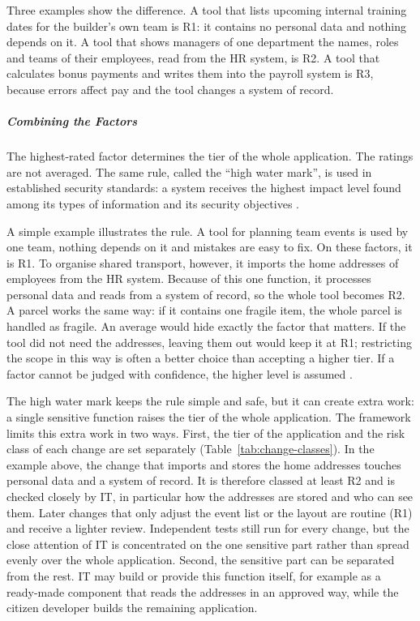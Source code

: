 \documentclass[10pt,a4paper]{article}
\begin{document}
Three examples show the difference. A tool that lists upcoming internal
training dates for the builder's own team is R1: it contains no personal
data and nothing depends on it. A tool that shows managers of one
department the names, roles and teams of their employees, read from the
HR system, is R2. A tool that calculates bonus payments and writes them
into the payroll system is R3, because errors affect pay and the tool
changes a system of record.

\subparagraph{Combining the Factors}

The highest-rated factor determines the tier of the whole application.
The ratings are not averaged. The same rule, called the \enquote{high
water mark}, is used in established security standards: a system
receives the highest impact level found among its types of information
and its security objectives \parencite{nist2004fips199,nist2006fips200}.

A simple example illustrates the rule. A tool for planning team events
is used by one team, nothing depends on it and mistakes are easy to fix.
On these factors, it is R1. To organise shared transport, however, it
imports the home addresses of employees from the HR system. Because of
this one function, it processes personal data and reads from a system of
record, so the whole tool becomes R2. A parcel works the same way: if it
contains one fragile item, the whole parcel is handled as fragile. An
average would hide exactly the factor that matters. If the tool did not
need the addresses, leaving them out would keep it at R1; restricting
the scope in this way is often a better choice than accepting a higher
tier. If a factor cannot be judged with confidence, the higher level is
assumed \parencite{kang2026}.

The high water mark keeps the rule simple and safe, but it can create
extra work: a single sensitive function raises the tier of the whole
application. The framework limits this extra work in two ways. First,
the tier of the application and the risk class of each change are set
separately (Table~\ref{tab:change-classes}). In the example above, the
change that imports and stores the home addresses touches personal data
and a system of record. It is therefore classed at least R2 and is
checked closely by IT, in particular how the addresses are stored and
who can see them. Later changes that only adjust the event list or the
layout are routine (R1) and receive a lighter review. Independent tests
still run for every change, but the close attention of IT is
concentrated on the one sensitive part rather than spread evenly over
the whole application. Second, the sensitive part can be separated from
the rest. IT may build or provide this function itself, for example as
a ready-made component that reads the addresses in an approved way,
while the citizen developer builds the remaining application.
\end{document}
